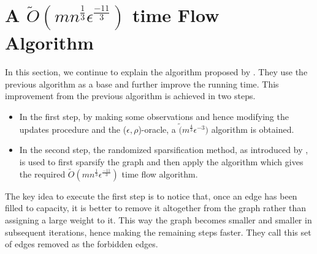 \documentclass[BTech]{iitmdiss}
\begin{document}
	    \section{A $\widetilde{O}(m n^{\frac{1}{3}}\epsilon^{\frac{-11}{3}})$ time Flow Algorithm}
	      In this section, we continue to explain the algorithm proposed by \cite{DBLP:journals/corr/abs-1010-2921}. They use the previous algorithm as a base and further improve 
	      the running time. This improvement from the previous algorithm is achieved in two steps.
	      \begin{itemize}
	       \item 
		In the first step, by making some observations and hence modifying the updates procedure and the ($\epsilon, \rho$)-oracle, a
		$\widetilde(m^{\frac{4}{3}}\epsilon^{-3})$ algorithm is obtained.
	      \item
		 In the second step, the randomized sparsification method, as introduced by \cite{Benczur:1996:ASM:237814.237827}, is used to first 
		 sparsify the graph and then apply the algorithm which gives the required $\widetilde{O}(m n^{\frac{1}{3}}\epsilon^{\frac{-11}{3}})$
		 time flow algorithm.
	      \end{itemize}
	      
	      The key idea to execute the first step is to notice that, once an edge has been filled to capacity, it is better to remove it altogether
	      from the graph rather than assigning a large weight to it. This way the graph becomes smaller and smaller in subsequent iterations,
	      hence making the remaining steps faster. They call this set of edges removed as the forbidden edges. \\
	      
\end{document}
